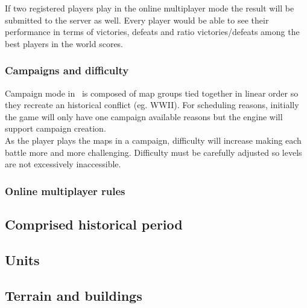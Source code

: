 If two registered players play in the online multiplayer mode the result will
be submitted to the server as well. Every player would be able to see their
performance in terms of victories, defeats and ratio victories/defeats among
the best players in the world scores.\\

\subsubsection{Campaigns and difficulty}

Campaign mode in \game\ is composed of map groups tied together in linear
order so they recreate an historical conflict (eg. WWII). For scheduling
reasons, initially the game will only have one campaign available reasons but
the engine will support campaign creation.\\

As the player plays the maps in a campaign, difficulty will increase making
each battle more and more challenging. Difficulty must be carefully adjusted so
levels are not excessively inaccessible.\\


\subsubsection{Online multiplayer rules}


\subsection{Comprised historical period}

\subsection{Units}

\subsection{Terrain and buildings}

